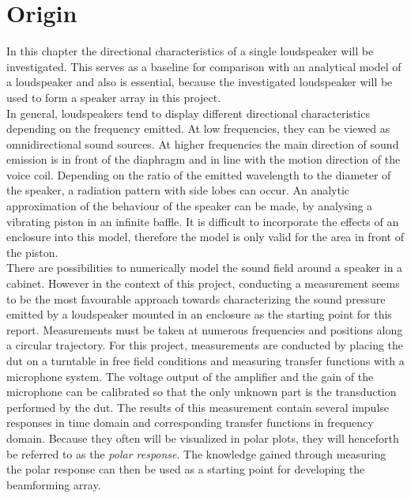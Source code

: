 \section{Origin}\label{ch:polar_response}
In this chapter the directional characteristics of a single loudspeaker will be investigated. This serves as a baseline for comparison with an analytical model of a loudspeaker and also is essential, because the investigated loudspeaker will be used to form a speaker array in this project.\\
In general, loudspeakers tend to display different directional characteristics depending on the frequency emitted. At low frequencies, they can be viewed as omnidirectional sound sources. At higher frequencies the main direction of sound emission is in front of the diaphragm and in line with the motion direction of the voice coil. \citep[p. 910 f.]{crocker98}
Depending on the ratio of the emitted wavelength to the diameter of the speaker, a radiation pattern with side lobes can occur. An analytic approximation of the behaviour of the speaker can be made, by analysing a vibrating piston in an infinite baffle. It is difficult to incorporate the effects of an enclosure into this model, therefore the model is only valid for  the area in front of the piston.\\
There are possibilities to numerically model the sound field around a speaker in a cabinet. However in the context of this project, conducting a measurement seems to be the most favourable approach towards characterizing the sound pressure emitted by a loudspeaker mounted in an enclosure as the starting point for this report. Measurements must be taken at numerous frequencies and positions along a circular trajectory.
For this project, measurements are conducted by placing the \gls{dut} on a turntable in free field conditions and measuring transfer functions with a microphone system. The voltage output of the amplifier and the gain of the microphone can be calibrated so that the only unknown part is the transduction performed by the \gls{dut}. The results of this measurement contain several  impulse responses in time domain and corresponding transfer functions in frequency domain. Because they often will be visualized in polar plots, they will henceforth be referred to as the \textit{polar response}.
The knowledge gained through measuring the polar response can then be used as a starting point for developing the beamforming array. 

